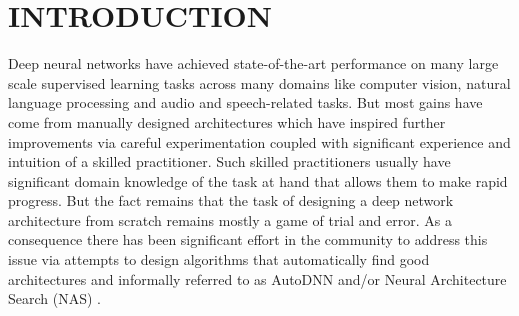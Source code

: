 

\section{INTRODUCTION}
\label{sec:nas_introduction}

Deep neural networks have achieved state-of-the-art performance on many large scale supervised learning tasks across many domains like computer vision, natural language processing and audio and speech-related tasks. But most gains have come from manually designed architectures which have inspired further improvements via careful experimentation coupled with significant experience and intuition of a skilled practitioner. Such skilled practitioners usually have significant domain knowledge of the task at hand that allows them to make rapid progress. But the fact remains that the task of designing a deep network architecture from scratch remains mostly a game of trial and error. As a consequence there has been significant effort in the community to address this issue via attempts to design algorithms that automatically find good architectures and informally referred to as AutoDNN and/or Neural Architecture Search (NAS) \cite{nas}. 

